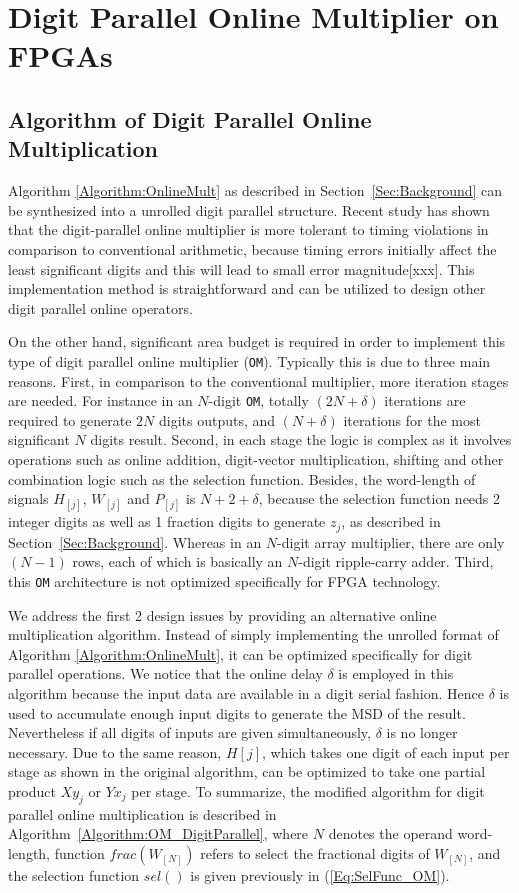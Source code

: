 \documentclass[conference]{IEEEtran}
\begin{document}
\section{Digit Parallel Online Multiplier on FPGAs}\label{Sec:OM_FPGA}
\subsection{Algorithm of Digit Parallel Online Multiplication}
Algorithm \ref{Algorithm:OnlineMult} as described in Section~\ref{Sec:Background} can be synthesized into a unrolled digit parallel structure. Recent study has shown that the digit-parallel online multiplier is more tolerant to timing violations in comparison to conventional arithmetic, because timing errors initially affect the least significant digits and this will lead to small error magnitude[xxx]. This implementation method is straightforward and can be utilized to design other digit parallel online operators.

On the other hand, significant area budget is required in order to implement this type of digit parallel online multiplier (\texttt{OM}). Typically this is due to three main reasons. First, in comparison to the conventional multiplier, more iteration stages are needed. For instance in an $N$-digit \texttt{OM}, totally $(2N+\delta)$ iterations are required to generate $2N$ digits outputs, and $(N+\delta)$ iterations for the most significant $N$ digits result. Second, in each stage the logic is complex as it involves operations such as online addition, digit-vector multiplication, shifting and other combination logic such as the selection function. Besides, the word-length of signals $H_{[j]}$, $W_{[j]}$ and $P_{[j]}$ is $N+2+\delta$, because the selection function needs 2 integer digits as well as 1 fraction digits to generate $z_j$, as described in Section~\ref{Sec:Background}. Whereas in an $N$-digit array multiplier, there are only $(N-1)$ rows, each of which is basically an $N$-digit ripple-carry adder. Third, this \texttt{OM} architecture is not optimized specifically for FPGA technology.

We address the first 2 design issues by providing an alternative online multiplication algorithm. Instead of simply implementing the unrolled format of Algorithm \ref{Algorithm:OnlineMult}, it can be optimized specifically for digit parallel operations. We notice that the online delay $\delta$ is employed in this algorithm because the input data are available in a digit serial fashion. Hence $\delta$ is used to accumulate enough input digits to generate the MSD of the result. Nevertheless if all digits of inputs are given simultaneously, $\delta$ is no longer necessary. Due to the same reason, $H[j]$, which takes one digit of each input per stage as shown in the original algorithm, can be optimized to take one partial product $Xy_j$ or $Yx_j$ per stage. To summarize, the modified algorithm for digit parallel online multiplication is described in Algorithm~\ref{Algorithm:OM_DigitParallel}, where $N$ denotes the operand word-length, function $frac(W_{[N]})$ refers to select the fractional digits of $W_{[N]}$, and the selection function $sel()$ is given previously in (\ref{Eq:SelFunc_OM}).
\end{document}
